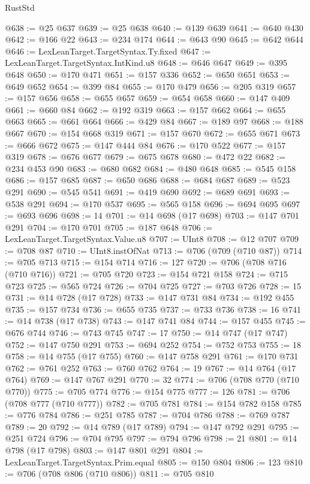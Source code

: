 \begin{lexlean}{RustStd}
\begin{coremodule}
@638 := @25 @637
@639 := @25 @638
@640 := @139 @639
@641 := @640 @430
@642 := @166 @22
@643 := @234 @174
@644 := @643 @90
@645 := @642 @644
@646 := LexLeanTarget.TargetSyntax.Ty.fixed
@647 := LexLeanTarget.TargetSyntax.IntKind.u8
@648 := @646 @647
@649 := @395 @648
@650 := @170 @471
@651 := @157 @336
@652 := @650 @651
@653 := @649 @652
@654 := @399 @84
@655 := @170 @479
@656 := @205 @319
@657 := @157 @656
@658 := @655 @657
@659 := @654 @658
@660 := @147 @409
@661 := @660 @84
@662 := @192 @319
@663 := @157 @662
@664 := @655 @663
@665 := @661 @664
@666 := @429 @84
@667 := @189 @97
@668 := @188 @667
@670 := @154 @668 @319
@671 := @157 @670
@672 := @655 @671
@673 := @666 @672
@675 := @147 @444 @84
@676 := @170 @522
@677 := @157 @319
@678 := @676 @677
@679 := @675 @678
@680 := @472 @22
@682 := @234 @453 @90
@683 := @680 @682
@684 := @480 @648
@685 := @545 @158
@686 := @157 @685
@687 := @650 @686
@688 := @684 @687
@689 := @523 @291
@690 := @545 @541
@691 := @419 @690
@692 := @689 @691
@693 := @538 @291
@694 := @170 @537
@695 := @565 @158
@696 := @694 @695
@697 := @693 @696
@698 := 14
@701 := @14 @698 (@17 @698)
@703 := @147 @701 @291
@704 := @170 @701
@705 := @187 @648
@706 := LexLeanTarget.TargetSyntax.Value.u8
@707 := UInt8
@708 := @12 @707
@709 := @708 @87
@710 := UInt8.instOfNat
@713 := @706 (@709 (@710 @87))
@714 := @705 @713
@715 := @154 @714
@716 := 127
@720 := @706 (@708 @716 (@710 @716))
@721 := @705 @720
@723 := @154 @721 @158
@724 := @715 @723
@725 := @565 @724
@726 := @704 @725
@727 := @703 @726
@728 := 15
@731 := @14 @728 (@17 @728)
@733 := @147 @731 @84
@734 := @192 @455
@735 := @157 @734
@736 := @655 @735
@737 := @733 @736
@738 := 16
@741 := @14 @738 (@17 @738)
@743 := @147 @741 @84
@744 := @157 @455
@745 := @676 @744
@746 := @743 @745
@747 := 17
@750 := @14 @747 (@17 @747)
@752 := @147 @750 @291
@753 := @694 @252
@754 := @752 @753
@755 := 18
@758 := @14 @755 (@17 @755)
@760 := @147 @758 @291
@761 := @170 @731
@762 := @761 @252
@763 := @760 @762
@764 := 19
@767 := @14 @764 (@17 @764)
@769 := @147 @767 @291
@770 := 32
@774 := @706 (@708 @770 (@710 @770))
@775 := @705 @774
@776 := @154 @775
@777 := 126
@781 := @706 (@708 @777 (@710 @777))
@782 := @705 @781
@784 := @154 @782 @158
@785 := @776 @784
@786 := @251 @785
@787 := @704 @786
@788 := @769 @787
@789 := 20
@792 := @14 @789 (@17 @789)
@794 := @147 @792 @291
@795 := @251 @724
@796 := @704 @795
@797 := @794 @796
@798 := 21
@801 := @14 @798 (@17 @798)
@803 := @147 @801 @291
@804 := LexLeanTarget.TargetSyntax.Prim.equal
@805 := @150 @804
@806 := 123
@810 := @706 (@708 @806 (@710 @806))
@811 := @705 @810

\end{coremodule}
\end{lexlean}
